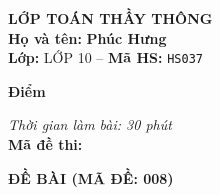 \noindent
\begin{tcolorbox}[colback=white,colframe=black,arc=0mm,boxrule=0.8pt,top=4pt,bottom=4pt,left=6pt,right=6pt]
	\begin{minipage}[c]{0.44\textwidth}
		{\bfseries\large LỚP TOÁN THẦY THÔNG}\\[3pt]
		\textbf{Họ và tên:} \textbf{\large Phúc Hưng}\\[3pt]
		\textbf{Lớp:} LỚP 10 \quad -- \quad \textbf{Mã HS:} \texttt{HS037}
	\end{minipage}
	\hfill
	\begin{minipage}[c]{0.22\textwidth}
		\begin{tcolorbox}[colback=white,colframe=black,arc=0mm,boxrule=0.6pt,height=1.8cm,halign=center,valign=top,top=2pt]
			{\bfseries\normalsize Điểm}
		\end{tcolorbox}
	\end{minipage}
	\hfill
	\begin{minipage}[c]{0.30\textwidth}
		\raggedleft
		\textit{Thời gian làm bài: 30 phút}\\[4pt]
		\textbf{Mã đề thi:} 
	\end{minipage}
\end{tcolorbox}
\vspace{0.25cm}

\noindent\textbf{\large ĐỀ BÀI (MÃ ĐỀ: 008)}
\vspace{0.1cm}

